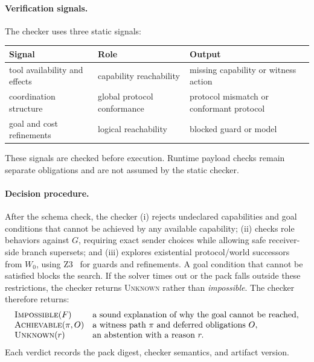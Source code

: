 \documentclass{article}
\theoremstyle{plain}
\theoremstyle{definition}
\begin{document}
\paragraph{Verification signals.}
The checker uses three static signals:
\begin{center}\small
\begin{tabular}{@{}p{.25\linewidth}p{.31\linewidth}p{.36\linewidth}@{}}
\toprule
\textbf{Signal} & \textbf{Role} & \textbf{Output}\\
\midrule
tool availability and effects & capability reachability & missing capability
or witness action\\
coordination structure & global protocol conformance & protocol mismatch or
conformant protocol\\
goal and cost refinements & logical reachability & blocked guard or model\\
\bottomrule
\end{tabular}
\end{center}
These signals are checked before execution. Runtime payload checks remain
separate obligations and are not assumed by the static checker.

\paragraph{Decision procedure.}
After the schema check, the checker (i) rejects undeclared capabilities and goal
conditions that cannot be achieved by any available capability; (ii) checks role
behaviors against $G$, requiring exact sender choices while allowing safe
receiver-side branch supersets; and (iii) explores existential protocol/world
successors from $W_0$, using Z3~\cite{z3} for guards and refinements. A goal condition that
cannot be satisfied blocks the search. If the solver times out or the pack falls
outside these restrictions, the checker returns \textsc{Unknown} rather than
\emph{impossible}. The checker therefore returns:
\[
\begin{array}{ll}
\textsc{Impossible}(F) & \text{a sound explanation of why the goal cannot be reached},\\
\textsc{Achievable}(\pi,O) & \text{a witness path }\pi\text{ and deferred
obligations }O,\\
\textsc{Unknown}(r) & \text{an abstention with a reason }r.
\end{array}
\]
Each verdict records the pack digest, checker semantics, and artifact version.
\end{document}
